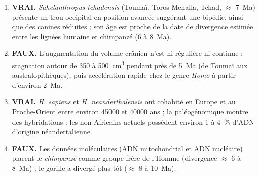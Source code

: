 \documentclass[11pt]{article}
\begin{document}
\begin{corrige}
\begin{enumerate}
    \item \textbf{VRAI.} \emph{Sahelanthropus tchadensis} (Toumaï, Toros-Menalla, Tchad, $\approx$ \SI{7}{Ma}) présente un trou occipital en position avancée suggérant une bipédie, ainsi que des canines réduites ; son âge est proche de la date de divergence estimée entre les lignées humaine et chimpanzé (6 à \SI{8}{Ma}).
    \item \textbf{FAUX.} L'augmentation du volume crânien n'est ni régulière ni continue : stagnation autour de 350 à \SI{500}{cm^3} pendant près de \SI{5}{Ma} (de Toumaï aux australopithèques), puis accélération rapide chez le genre \emph{Homo} à partir d'environ \SI{2}{Ma}.
    \item \textbf{VRAI.} \emph{H. sapiens} et \emph{H. neanderthalensis} ont cohabité en Europe et au Proche-Orient entre environ \num{45000} et \num{40000} ans ; la paléogénomique montre des hybridations : les non-Africains actuels possèdent environ 1 à \SI{4}{\%} d'ADN d'origine néandertalienne.
    \item \textbf{FAUX.} Les données moléculaires (ADN mitochondrial et ADN nucléaire) placent le \emph{chimpanzé} comme groupe frère de l'Homme (divergence $\approx$ 6 à \SI{8}{Ma}) ; le gorille a divergé plus tôt ($\approx$ 8 à \SI{10}{Ma}).
\end{enumerate}
\end{corrige}
\end{document}
